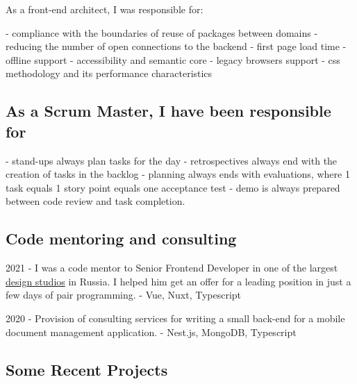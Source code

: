 \documentclass{yb}
\begin{document}
\begin{samepage}
As a front-end architect, I was responsible for:

 - compliance with the boundaries of reuse of packages between domains
\newline - reducing the number of open connections to the backend
\newline - first page load time
\newline - offline support
\newline - accessibility and semantic core
\newline - legacy browsers support
\newline - css methodology and its performance characteristics

\end{samepage}

\subsection*{As a Scrum Master, I have been responsible for}

 - stand-ups always plan tasks for the day
\newline - retrospectives always end with the creation of tasks in the backlog
\newline - planning always ends with evaluations, where 1 task equals 1 story point equals one acceptance test
\newline - demo is always prepared between code review and task completion.

\begin{samepage}

\subsection*{Code mentoring and consulting}

2021 - I was a code mentor to Senior Frontend Developer in one of the largest \href{https://pinkman.ru/}{design studios} in Russia. I helped him get an offer for a leading position in just a few days of pair programming.
\newline - Vue, Nuxt, Typescript

2020 - Provision of consulting services for writing a small back-end for a mobile document management application.
\newline - Nest.js, MongoDB, Typescript

\end{samepage}

\subsection*{Some Recent Projects}
\end{document}
